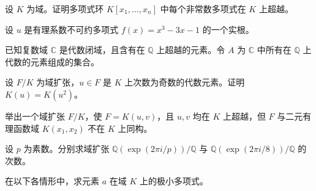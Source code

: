 \noindent\begin{minipage}{\textwidth}
设 $K$ 为域。证明多项式环 $K[x_1,\ldots,x_n]$ 中每个非常数多项式在 $K$ 上超越。
\end{minipage}\par\vfill
\newpage
\noindent\begin{minipage}{\textwidth}
设 $u$ 是有理系数不可约多项式 $f(x)=x^3-3x-1$ 的一个实根。
\end{minipage}\par\vfill
\noindent\begin{minipage}{\textwidth}
已知复数域 $\mathbb{C}$ 是代数闭域，且含有在 $\mathbb{Q}$ 上超越的元素。令 $A$ 为 $\mathbb{C}$ 中所有在 $\mathbb{Q}$ 上代数的元素组成的集合。
\end{minipage}\par\vfill
\noindent\begin{minipage}{\textwidth}
设 $F/K$ 为域扩张，$u\in F$ 是 $K$ 上次数为奇数的代数元素。证明 $K(u)=K(u^2)$。
\end{minipage}\par\vfill
\newpage
\noindent\begin{minipage}{\textwidth}
举出一个域扩张 $F/K$，使 $F=K(u,v)$，且 $u,v$ 均在 $K$ 上超越，但 $F$ 与二元有理函数域 $K(x_1,x_2)$ 不在 $K$ 上同构。
\end{minipage}\par\vfill
\noindent\begin{minipage}{\textwidth}
设 $p$ 为素数。分别求域扩张 $\mathbb{Q}(\exp(2\pi i/p))/\mathbb{Q}$ 与 $\mathbb{Q}(\exp(2\pi i/8))/\mathbb{Q}$ 的次数。
\end{minipage}\par\vfill
\noindent\begin{minipage}{\textwidth}
在以下各情形中，求元素 $a$ 在域 $K$ 上的极小多项式。
\end{minipage}\par\vfill
